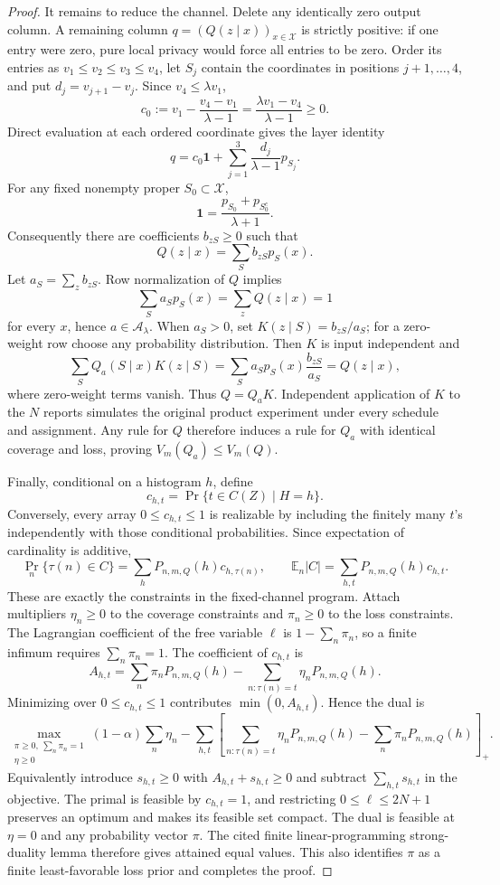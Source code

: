 \documentclass{article}
\begin{document}
\begin{proof}
It remains to reduce the channel.  Delete any identically zero output column.  A remaining column \(q=(Q(z\mid x))_{x\in\mathcal X}\) is strictly positive: if one entry were zero, pure local privacy would force all entries to be zero.  Order its entries as \(v_1\le v_2\le v_3\le v_4\), let \(S_j\) contain the coordinates in positions \(j+1,\ldots,4\), and put \(d_j=v_{j+1}-v_j\).  Since \(v_4\le\lambda v_1\),
\[
 c_0:=v_1-\frac{v_4-v_1}{\lambda-1}
     =\frac{\lambda v_1-v_4}{\lambda-1}\ge0.
\]
Direct evaluation at each ordered coordinate gives the layer identity
\[
 q=c_0\mathbf 1+\sum_{j=1}^3\frac{d_j}{\lambda-1}p_{S_j}.
\]
For any fixed nonempty proper \(S_0\subset\mathcal X\),
\[
 \mathbf 1=\frac{p_{S_0}+p_{S_0^c}}{\lambda+1}.
\]
Consequently there are coefficients \(b_{zS}\ge0\) such that
\[
 Q(z\mid x)=\sum_S b_{zS}p_S(x).
\]
Let \(a_S=\sum_zb_{zS}\).  Row normalization of \(Q\) implies
\[
 \sum_Sa_Sp_S(x)=\sum_zQ(z\mid x)=1
\]
for every \(x\), hence \(a\in\mathcal A_\lambda\).  When \(a_S>0\), set \(K(z\mid S)=b_{zS}/a_S\); for a zero-weight row choose any probability distribution.  Then \(K\) is input independent and
\[
 \sum_SQ_a(S\mid x)K(z\mid S)
 =\sum_Sa_Sp_S(x)\frac{b_{zS}}{a_S}=Q(z\mid x),
\]
where zero-weight terms vanish.  Thus \(Q=Q_aK\).  Independent application of \(K\) to the \(N\) reports simulates the original product experiment under every schedule and assignment.  Any rule for \(Q\) therefore induces a rule for \(Q_a\) with identical coverage and loss, proving \(V_m(Q_a)\le V_m(Q)\).

Finally, conditional on a histogram \(h\), define
\[
 c_{h,t}=\Pr\{t\in C(Z)\mid H=h\}.
\]
Conversely, every array \(0\le c_{h,t}\le1\) is realizable by including the finitely many \(t\)'s independently with those conditional probabilities.  Since expectation of cardinality is additive,
\[
 \Pr_n\{\tau(n)\in C\}=\sum_hP_{n,m,Q}(h)c_{h,\tau(n)},
 \qquad
 \mathbb E_n|C|=\sum_{h,t}P_{n,m,Q}(h)c_{h,t}.
\]
These are exactly the constraints in the fixed-channel program.  Attach multipliers \(\eta_n\ge0\) to the coverage constraints and \(\pi_n\ge0\) to the loss constraints.  The Lagrangian coefficient of the free variable \(\ell\) is \(1-\sum_n\pi_n\), so a finite infimum requires \(\sum_n\pi_n=1\).  The coefficient of \(c_{h,t}\) is
\[
 A_{h,t}=\sum_n\pi_nP_{n,m,Q}(h)
 -\sum_{n:\tau(n)=t}\eta_nP_{n,m,Q}(h).
\]
Minimizing over \(0\le c_{h,t}\le1\) contributes \(\min(0,A_{h,t})\).  Hence the dual is
\[
 \max_{\substack{\pi\ge0,\ \sum_n\pi_n=1\\ \eta\ge0}}
 (1-\alpha)\sum_n\eta_n-
 \sum_{h,t}\left[
 \sum_{n:\tau(n)=t}\eta_nP_{n,m,Q}(h)-
 \sum_n\pi_nP_{n,m,Q}(h)
 \right]_+.
\]
Equivalently introduce \(s_{h,t}\ge0\) with \(A_{h,t}+s_{h,t}\ge0\) and subtract \(\sum_{h,t}s_{h,t}\) in the objective.  The primal is feasible by \(c_{h,t}=1\), and restricting \(0\le\ell\le2N+1\) preserves an optimum and makes its feasible set compact.  The dual is feasible at \(\eta=0\) and any probability vector \(\pi\).  The cited finite linear-programming strong-duality lemma therefore gives attained equal values.  This also identifies \(\pi\) as a finite least-favorable loss prior and completes the proof.
\end{proof}
\end{document}
